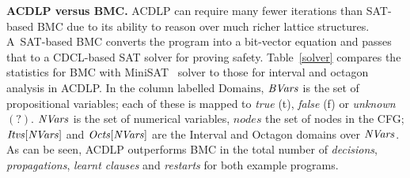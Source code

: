 \medskip

\noindent \textbf{ACDLP versus BMC.}
ACDLP can require many fewer iterations than SAT-based BMC due to its
ability to reason over much richer lattice structures.
A~SAT-based BMC converts the program into a bit-vector equation 
and passes that to a CDCL-based SAT solver for proving safety.  
Table~\ref{solver} compares the statistics for BMC with 
MiniSAT~\cite{minisat} solver to those for interval and octagon 
analysis in ACDLP. In the column labelled $\textrm{Domains}$, 
$\mathit{BVars}$ is the set of propositional variables; each of these is mapped to
{\em true} (t), {\em false} (f) or {\em unknown} $(?)$. $\mathit{NVars}$ is the set of
numerical variables, $\mathit{nodes}$ the set of nodes in the CFG;
$\mathit{Itvs}[\mathit{NVars}]$ and $\mathit{Octs}[\mathit{NVars}]$ are the Interval and Octagon
domains over $\mathit{NVars}$. As can be seen, ACDLP outperforms BMC in the total number of 
{\em decisions}, {\em propagations}, {\em learnt clauses} and {\em restarts} 
for both example programs.

